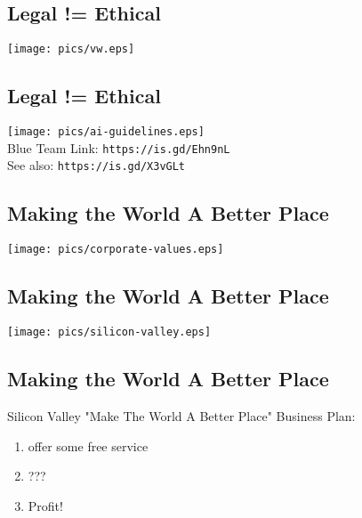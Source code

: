 \documentclass[xga]{xdvislides}
\begin{document}
\subsection{Legal != Ethical}
\vspace*{\fill}
\begin{center}
	\texttt{[image: pics/vw.eps]}
\end{center}
\vspace*{\fill}

\subsection{Legal != Ethical}
\vspace*{\fill}
\begin{center}
	\texttt{[image: pics/ai-guidelines.eps]} \\
	\small 
	Blue Team Link: {\tt https://is.gd/Ehn9nL} \\
	See also: {\tt https://is.gd/X3vGLt}
	\Normalsize
\end{center}
\vspace*{\fill}

\subsection{Making the World A Better Place}
\vspace*{\fill}
\begin{center}
	\texttt{[image: pics/corporate-values.eps]}
\end{center}
\vspace*{\fill}

\subsection{Making the World A Better Place}
\vspace*{\fill}
\begin{center}
	\texttt{[image: pics/silicon-valley.eps]}
\end{center}
\vspace*{\fill}

\subsection{Making the World A Better Place}
Silicon Valley "Make The World A Better Place"
Business Plan:

\vspace*{\fill}
\begin{enumerate}
	\item offer some free service
	\item ???
	\item Profit!
\end{enumerate}
\vspace*{\fill}
\end{document}
